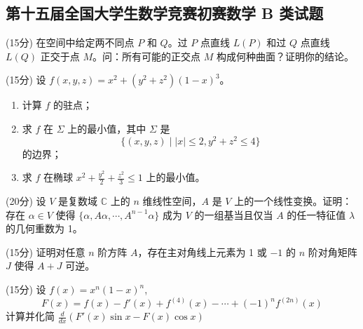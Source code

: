 \documentclass[loose]{ExBook}
\begin{document}
\subsection{第十五届全国大学生数学竞赛初赛数学 B 类试题}
\begin{qitems}

    \begin{bbox}
        \qitem (15分) 在空间中给定两不同点 \( P \) 和 \( Q \)。过 \( P \) 点直线 \( L(P) \) 和过 \( Q \) 点直线 \( L(Q) \) 正交于点 \( M \)。问：所有可能的正交点 \( M \) 构成何种曲面？证明你的结论。
    \end{bbox}

    \begin{bbox}
        \qitem (15分) 设 \( f(x, y, z) = x^2 + (y^2 + z^2)(1 - x)^3 \)。
        \begin{enumerate}[label=(\arabic*)]
            \item 计算 \( f \) 的驻点；
            \item 求 \( f \) 在 \(\Sigma\) 上的最小值，其中 \(\Sigma\) 是
            \[\{(x, y, z) \mid |x| \leq 2, y^2 + z^2 \leq 4\}\]
            的边界；
            \item 求 \( f \) 在椭球 \( x^2 + \frac{y^2}{2} + \frac{z^2}{3} \leq 1 \) 上的最小值。
        \end{enumerate}
    \end{bbox}

    \begin{bbox}
        \qitem (20分) 设 \( V \) 是复数域 \( \mathbb{C} \) 上的 \( n \) 维线性空间，\( A \) 是 \( V \) 上的一个线性变换。证明：存在 \( \alpha \in V \) 使得
        \(
        \{\alpha, A\alpha, \cdots, A^{n-1}\alpha\}
        \)
        成为 \( V \) 的一组基当且仅当 \( A \) 的任一特征值 \( \lambda \) 的几何重数为 1。
    \end{bbox}

    \begin{bbox}
        \qitem (15分) 证明对任意 \( n \) 阶方阵 \( A \)，存在主对角线上元素为 1 或 \(-1\) 的 \( n \) 阶对角矩阵 \( J \) 使得 \( A + J \) 可逆。
    \end{bbox}

    \begin{bbox}
        \qitem (15分) 设 \( f(x) = x^n(1 - x)^n \),
        \[
        F(x) = f(x) - f'(x) + f^{(4)}(x) - \cdots + (-1)^n f^{(2n)}(x)
        \]
        计算并化简
        \(
        \frac{d}{dx} \left( F'(x) \sin x - F(x) \cos x \right)
        \)
    \end{bbox}


\end{qitems}
\end{document}
